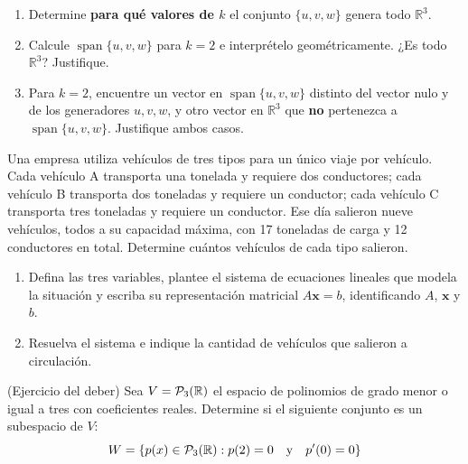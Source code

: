 \documentclass[10pt,a4]{examenEPN0}
\begin{document}
\begin{preguntas}
\begin{enumerate}
    \item Determine \textbf{para qué valores de \(k\)} el conjunto \(\{u, v, w\}\) genera todo \(\mathbb{R}^3\).  
    \item Calcule \(\operatorname{span}\{u, v, w\}\) para \(k = 2\) e interprételo geométricamente. ¿Es todo \(\mathbb{R}^3\)? Justifique.  
    \item Para \(k = 2\), encuentre un vector en \(\operatorname{span}\{u, v, w\}\) distinto del vector nulo y de los generadores \(u, v, w\), y otro vector en \(\mathbb{R}^3\) que \textbf{no} pertenezca a \(\operatorname{span}\{u, v, w\}\). Justifique ambos casos.  
\end{enumerate}



\item Una empresa utiliza vehículos de tres tipos para un único viaje por vehículo. Cada vehículo A transporta una tonelada y requiere dos conductores; cada vehículo B transporta dos toneladas y requiere un conductor; cada vehículo C transporta tres toneladas y requiere un conductor. Ese día salieron nueve vehículos, todos a su capacidad máxima, con 17 toneladas de carga y 12 conductores en total. Determine cuántos vehículos de cada tipo salieron.

\begin{enumerate}
    \item Defina las tres variables, plantee el sistema de ecuaciones lineales que modela la situación y escriba su representación matricial $A\mathbf{x}=b$, identificando $A$, $\mathbf{x}$ y $b$. 
    \item Resuelva el sistema e indique la cantidad de vehículos que salieron a circulación. 
\end{enumerate}

\item (Ejercicio del deber)  Sea $V = \mathcal{P}_3(\mathbb{R})$ el espacio de polinomios de grado menor o igual a tres con coeficientes reales. Determine si el siguiente conjunto es un subespacio de $V$: 
    \[
    W = \left\{ p(x) \in \mathcal{P}_3(\mathbb{R}) : p(2) = 0 \quad \text{y} \quad p'(0) = 0 \right\}
    \]    




\end{preguntas}
\final
\end{document}

